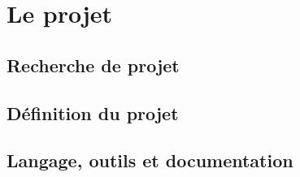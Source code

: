 \section{Le projet}
\subsection{Recherche de projet}
\subsection{Définition du projet}
\subsection{Langage, outils et documentation}